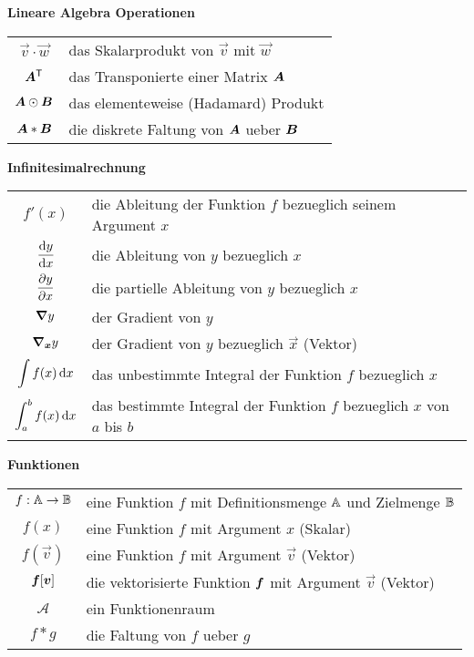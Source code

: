 \begin{center}\textbf{Lineare Algebra Operationen}\end{center}
\begin{tabular}{cl}
  $\vec{v} \cdot \vec{w}$ & das Skalarprodukt von $\vec{v}$ mit $\vec{w}$ \\
  $\bm{A}^{\mathsf{T}}$ & das Transponierte einer Matrix $\bm{A}$ \\
  $\bm{A} \odot \bm{B}$ & das elementeweise (Hadamard) Produkt \\
  $\bm{A} * \bm{B}$ & die diskrete Faltung von $\bm{A}$ ueber $\bm{B}$

\end{tabular}

\begin{center}\textbf{Infinitesimalrechnung}\end{center}
\begin{tabular}{cl}
  $f'(x)$ & die Ableitung der Funktion $f$ bezueglich seinem Argument $x$ \\
  $\displaystyle\frac{\text{d}y}{\text{d}x}$ & die Ableitung von $y$ bezueglich $x$ \\[2ex]
  $\displaystyle\frac{\partial y}{\partial x}$ & die partielle Ableitung von $y$ bezueglich $x$ \\[2ex]
  $\bm{\nabla} y$ & der Gradient von $y$\\
  $\bm{\nabla}_{\bm{x}}y$ & der Gradient von $y$ bezueglich $\vec{x}$ (Vektor) \\
  $\displaystyle\int f(x)\,\text{d}x$ & das unbestimmte Integral der Funktion $f$ bezueglich $x$ \\
  $\displaystyle\int_a^b f(x)\,\text{d}x$ & das bestimmte Integral der Funktion $f$ bezueglich $x$ von $a$ bis $b$ \\

\end{tabular}

\begin{center}\textbf{Funktionen}\end{center}
\begin{tabular}{cl}
  $f: \mathbb{A} \to \mathbb{B}$ & eine Funktion $f$ mit Definitionsmenge $\mathbb{A}$ und Zielmenge $\mathbb{B}$ \\
  $f(x)$ & eine Funktion $f$ mit Argument $x$ (Skalar) \\
  $f(\vec{v})$ & eine Funktion $f$ mit Argument $\vec{v}$ (Vektor) \\
  $\bm{f}[\bm{v}]$ & die vektorisierte Funktion $\bm{f}$ mit Argument $\vec{v}$ (Vektor) \\
  $\mathcal{A}$ & ein Funktionenraum \\
  $f * g$ & die Faltung von $f$ ueber $g$ \\

\end{tabular}

